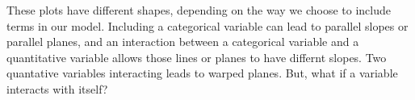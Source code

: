 \documentclass[10pt]{article}
\begin{document}
These plots have different shapes, depending on the way we choose to include terms in our model. Including a categorical variable can lead to parallel slopes or parallel planes, and an interaction between a categorical variable and a quantitative variable allows those lines or planes to have differnt slopes. Two quantative variables interacting leads to warped planes. But, what if a variable interacts with itself?

% 
% 
% 
% 
% 
% 
% 
\end{document}
